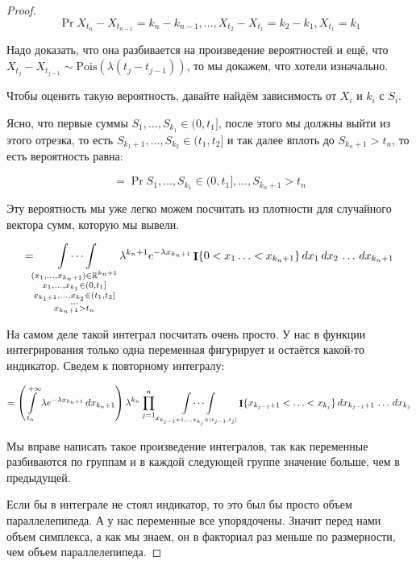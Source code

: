 \begin{proof}
  \[
    \Pr{X_{t_n} - X_{t_{n - 1}} = k_n - k_{n - 1}, \ldots, X_{t_2} - X_{t_1} = 
    k_2 - k_1, X_{t_1} = k_1}
  \]
  
  Надо доказать, что она разбивается на
  произведение вероятностей и ещё, что $X_{t_j} - X_{t_{j - 1}} \sim
  \mathrm{Pois}(\lambda(t_j - t_{j - 1}))$, то мы докажем, что хотели изначально.

  Чтобы оценить такую вероятность, давайте найдём зависимость от $X_i$ и $k_i$ с
  $S_i$.

  Ясно, что первые суммы $S_1, \ldots, S_{k_1} \in (0, t_1]$, после этого
  мы должны выйти из этого отрезка, то есть $S_{k_1 + 1}, \ldots, S_{k_2} \in
  (t_1, t_2]$ и так далее вплоть до $S_{k_n + 1} > t_n$, то есть вероятность равна:

  \[
    =\Pr{S_1, \ldots, S_{k_1} \in (0, t_1], \ldots, S_{k_n + 1} > t_n}
  \]

  Эту вероятность мы уже легко можем посчитать из плотности для случайного вектора
  сумм, которую мы вывели.

  \[
    = \idotsint\limits_{\substack{(x_1, \ldots, x_{k_n + 1}) \in \mathbb{R}^{k_n + 1}\\
    x_1, \ldots, x_{k_1} \in (0, t_1] \\ x_{k_1 + 1}, \ldots, x_{k_2} \in 
    (t_1, t_2] \\\ldots \\x_{k_n + 1} > t_n}}
    \lambda^{k_n + 1} e^{-\lambda x_{k_n + 1}} \mathop{\mathbf{I}}\{0 < x_1 \ldots < x_{k_n + 1}\}
    \,dx_1\,dx_2\,\ldots\,dx_{k_n + 1}
  \]

  На самом деле такой интеграл посчитать очень просто. У нас в функции интегрирования
  только одна переменная фигурирует и остаётся какой-то индикатор. Сведем
  к повторному интегралу:

  \[
    = \left(\int\limits_{t_n}^{+\infty} \lambda e^{-\lambda x_{k_n + 1}}\,
    dx_{k_n + 1}\right)
    \lambda^{k_n} \prod\limits_{j = 1}^n \ \idotsint\limits_{x_{k_{j - 1} + 1, \ldots
    x_{k_j} \in (t_{j - 1}, t_j]}} \mathop{\mathbf{I}}\{x_{k_{j - 1} + 1} < \ldots < x_{k_j}\}
    \,dx_{k_{j - 1} + 1}\,\ldots\,dx_{k_j}
  \]

  Мы вправе написать такое произведение интегралов, так как переменные разбиваются
  по группам и в каждой следующей группе значение больше, чем в предыдущей.

  Если бы в интеграле не стоял индикатор, то это был бы просто объем параллелепипеда.
  А у нас переменные все упорядочены. Значит перед нами объем симплекса, а как
  мы знаем, он в факториал раз меньше по размерности, чем объем параллелепипеда.


\end{proof}

